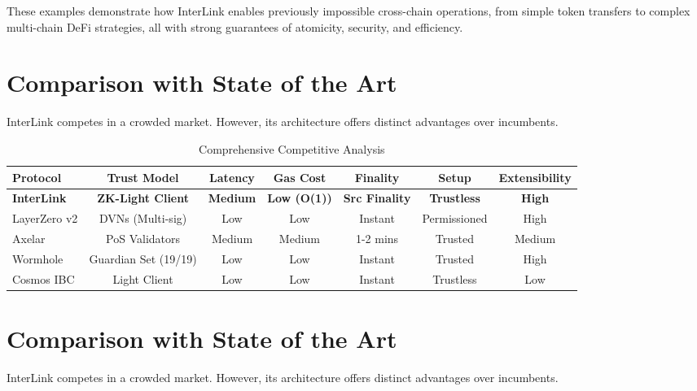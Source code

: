 \documentclass[11pt,a4paper]{article}
\begin{document}
These examples demonstrate how InterLink enables previously impossible cross-chain operations, from simple token transfers to complex multi-chain DeFi strategies, all with strong guarantees of atomicity, security, and efficiency.

\section{Comparison with State of the Art}
\label{sec:compare}

InterLink competes in a crowded market. However, its architecture offers distinct advantages over incumbents.

\begin{table}[H]
\centering
\small
\begin{tabular}{@{}lcccccc@{}}
\toprule
\textbf{Protocol} & \textbf{Trust Model} & \textbf{Latency} & \textbf{Gas Cost} & \textbf{Finality} & \textbf{Setup} & \textbf{Extensibility} \\ \midrule
\textbf{InterLink} & \textbf{ZK-Light Client} & \textbf{Medium} & \textbf{Low (O(1))} & \textbf{Src Finality} & \textbf{Trustless} & \textbf{High} \\
LayerZero v2 & DVNs (Multi-sig) & Low & Low & Instant & Permissioned & High \\
Axelar & PoS Validators & Medium & Medium & 1-2 mins & Trusted & Medium \\
Wormhole & Guardian Set (19/19) & Low & Low & Instant & Trusted & High \\
Cosmos IBC & Light Client & Low & Low & Instant & Trustless & Low \\ \bottomrule
\end{tabular}
\caption{Comprehensive Competitive Analysis}
\label{tab:comparison_detailed}
\end{table}

\section{Comparison with State of the Art}
\label{sec:compare}

InterLink competes in a crowded market. However, its architecture offers distinct advantages over incumbents.
\end{document}
